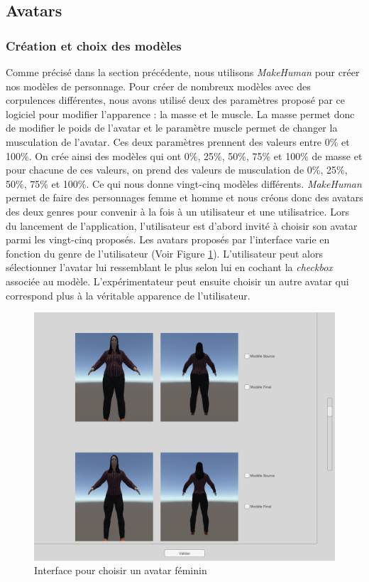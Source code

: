 \subsection{Avatars}
\subsubsection{Création et choix des modèles}
Comme précisé dans la section précédente, nous utilisons \emph{MakeHuman} pour créer nos modèles de personnage. Pour créer de nombreux modèles avec des corpulences différentes, nous avons utilisé deux des paramètres proposé par ce logiciel pour modifier l'apparence : la masse et le muscle. La masse permet donc de modifier le poids de l'avatar et le paramètre muscle permet de changer la musculation de l'avatar. Ces deux paramètres prennent des valeurs entre 0\% et 100\%. On crée ainsi des modèles qui ont 0\%, 25\%, 50\%, 75\% et 100\% de masse et pour chacune de ces valeurs, on prend des valeurs de musculation de 0\%, 25\%, 50\%, 75\% et 100\%. Ce qui nous donne vingt-cinq modèles différents. \emph{MakeHuman} permet de faire des personnages femme et homme et nous créons donc des avatars des deux genres pour convenir à la fois à un utilisateur et une utilisatrice. Lors du lancement de l'application, l'utilisateur est d'abord invité à choisir son avatar parmi les vingt-cinq proposés. Les avatars proposés par l'interface varie en fonction du genre de l'utilisateur (Voir Figure \ref{uiF}). L'utilisateur peut alors sélectionner l'avatar lui ressemblant le plus selon lui en cochant la \emph{checkbox} associée au modèle. L'expérimentateur peut ensuite choisir un autre avatar qui correspond plus à la véritable apparence de l'utilisateur.
\begin{figure}[!h]
   	\centerline{\includegraphics[scale=0.30]{images/interfaceF}}
   	\caption{\label{uiF} Interface pour choisir un avatar féminin }
\end{figure}
